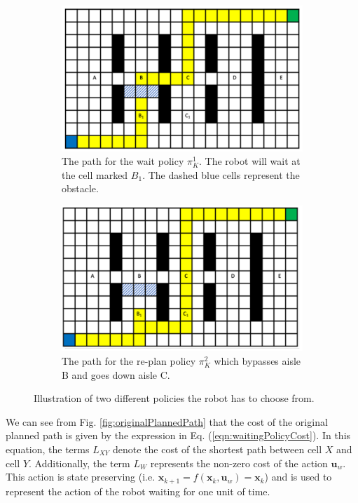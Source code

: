 \documentclass[a4paper,12pt]{article}
\begin{document}
			\begin{figure}[H]
				\centering
				\begin{subfigure}{.4\textwidth}
					\centering
					\includegraphics[width=\linewidth]{blockedAisleB.png}
					\caption{The path for the wait policy $\pi_{K}^{1}$. The robot will wait at the cell marked $B_1$. The dashed blue cells represent the obstacle.}
					\label{fig:waitPathAisleB}
				\end{subfigure}
				\begin{subfigure}{.4\textwidth}
					\centering
					\includegraphics[width=\linewidth]{replannedPathAisleB.png}
					\caption{The path for the re-plan policy $\pi_{K}^{2}$ which bypasses aisle B and goes down aisle C.}
					\label{fig:replannedPathAisleB}
				\end{subfigure}
				\caption{Illustration of two different policies the robot has to choose from.}
				\label{fig:policiesMaps}
			\end{figure}

			We can see from Fig. \ref{fig:originalPlannedPath} that the cost of the original planned path is given by the expression in Eq. (\ref{eqn:waitingPolicyCost}). In this equation, the terms $L_{XY}$ denote the cost of the shortest path between cell $X$ and cell $Y$. Additionally, the term $L_{W}$ represents the non-zero cost of the action $\boldsymbol{u}_w$. This action is state preserving (i.e. $\boldsymbol{x}_{k+1} = f(\boldsymbol{x}_k,\boldsymbol{u}_w) = \boldsymbol{x}_k$) and is used to represent the action of the robot waiting for one unit of time.
			
\end{document}
